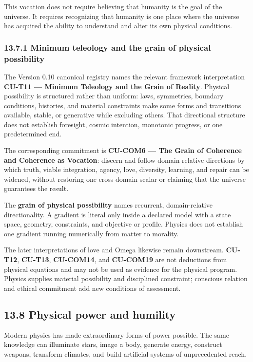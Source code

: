 \documentclass[
  11pt,
]{article}
\begin{document}
This vocation does not require believing that humanity is the goal of
the universe. It requires recognizing that humanity is one place where
the universe has acquired the ability to understand and alter its own
physical conditions.

\subsubsection{13.7.1 Minimum teleology and the grain of physical
possibility}\label{minimum-teleology-and-the-grain-of-physical-possibility}

The Version 0.10 canonical registry names the relevant framework
interpretation \textbf{CU-T11 --- Minimum Teleology and the Grain of
Reality}. Physical possibility is structured rather than uniform: laws,
symmetries, boundary conditions, histories, and material constraints
make some forms and transitions available, stable, or generative while
excluding others. That directional structure does not establish
foresight, cosmic intention, monotonic progress, or one predetermined
end.

The corresponding commitment is \textbf{CU-COM6 --- The Grain of
Coherence and Coherence as Vocation}: discern and follow domain-relative
directions by which truth, viable integration, agency, love, diversity,
learning, and repair can be widened, without restoring one cross-domain
scalar or claiming that the universe guarantees the result.

The \textbf{grain of physical possibility} names recurrent,
domain-relative directionality. A gradient is literal only inside a
declared model with a state space, geometry, constraints, and objective
or profile. Physics does not establish one gradient running numerically
from matter to morality.

The later interpretations of love and Omega likewise remain downstream.
\textbf{CU-T12}, \textbf{CU-T13}, \textbf{CU-COM14}, and
\textbf{CU-COM19} are not deductions from physical equations and may not
be used as evidence for the physical program. Physics supplies material
possibility and disciplined constraint; conscious relation and ethical
commitment add new conditions of assessment.

\subsection{13.8 Physical power and
humility}\label{physical-power-and-humility}

Modern physics has made extraordinary forms of power possible. The same
knowledge can illuminate stars, image a body, generate energy, construct
weapons, transform climates, and build artificial systems of
unprecedented reach.
\end{document}
